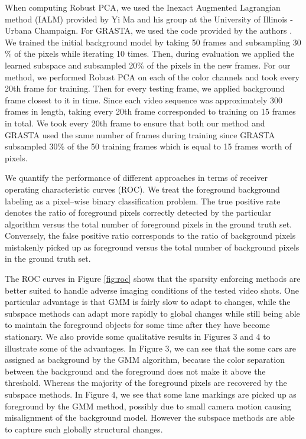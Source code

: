 \documentclass{article}
\begin{document}
When computing Robust PCA, we used the Inexact Augmented Lagrangian method (IALM) \cite{alm} provided by Yi Ma and his group at the University of Illinois - Urbana Champaign. For GRASTA, we used the code provided by the authors \cite{grastaCode}. We trained the initial background model by taking 50 frames and subsampling 30$\%$ of the pixels while iterating 10 times. Then, during evaluation we applied the learned subspace and subsampled 20$\%$ of the pixels in the new frames. For our method, we performed Robust PCA on each of the color channels and took every 20th frame for training. Then for every testing frame, we applied background frame closest to it in time. Since each video sequence was approximately 300 frames in length, taking every 20th frame corresponded to training on 15 frames in total. We took every 20th frame to ensure that both our method and GRASTA used the same number of frames during training since GRASTA subsampled 30$\%$ of the 50 training frames which is equal to 15 frames worth of pixels.

We quantify the performance of different approaches in terms of receiver operating characteristic curves (ROC).  We treat the foreground background labeling as a pixel--wise binary classification problem.  The true positive rate denotes the ratio of foreground pixels correctly detected by the particular algorithm versus the total number of foreground pixels in the ground truth set.  Conversely, the false positive ratio corresponds to the ratio of background pixels mistakenly picked up as foreground versus the total number of background pixels in the ground truth set.

The ROC curves in Figure \ref{fig:roc} shows that the sparsity enforcing methods are better suited to handle adverse imaging conditions of the tested video shots.  One particular advantage is that GMM is fairly slow to adapt to changes, while the subspace methods can adapt more rapidly to global changes while still being able to maintain the foreground objects for some time after they have become stationary. We also provide some qualitative results in Figures 3 and 4 to illustrate some of the advantages.  In Figure 3, we can see that the some cars are assigned as background by the GMM algorithm, because the color separation between the background and the foreground does not make it above the threshold.  Whereas the majority of the foreground pixels are recovered by the subspace methods.  In Figure 4, we see that some lane markings are picked up as foreground by the GMM method, possibly due to small camera motion causing misalignment of the background model.  However the subspace methods are able to capture such globally structural changes.
\end{document}
